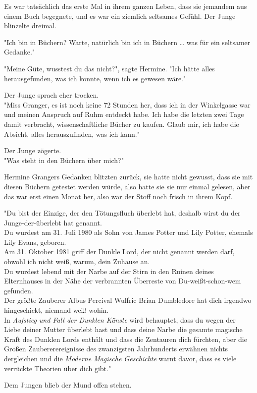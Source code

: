 {Es war tatsächlich das erste Mal in ihrem ganzen Leben, dass sie jemandem aus einem Buch begegnete, und es war ein ziemlich seltsames Gefühl. Der Junge blinzelte dreimal.

"Ich bin in Büchern? Warte, natürlich bin ich in Büchern … was für ein seltsamer Gedanke."

"Meine Güte, wusstest du das nicht?", sagte Hermine. "Ich hätte alles herausgefunden, was ich konnte, wenn ich es gewesen wäre."

Der Junge sprach eher trocken.\\ "Miss Granger, es ist noch keine 72 Stunden her, dass ich in der Winkelgasse war und meinen Anspruch auf Ruhm entdeckt habe. Ich habe die letzten zwei Tage damit verbracht, wissenschaftliche Bücher zu kaufen. Glaub mir, ich habe die Absicht, alles herauszufinden, was ich kann."

Der Junge zögerte.\\ "Was steht in den Büchern über mich?"

Hermine Grangers Gedanken blitzten zurück, sie hatte nicht gewusst, dass sie mit diesen Büchern getestet werden würde, also hatte sie sie nur einmal gelesen, aber das war erst einen Monat her, also war der Stoff noch frisch in ihrem Kopf.

"Du bist der Einzige, der den Tötungsfluch überlebt hat, deshalb wirst du der Junge-der-überlebt hat genannt.\\ Du wurdest am 31. Juli 1980 als Sohn von James Potter und Lily Potter, ehemals Lily Evans, geboren.\\ Am 31. Oktober 1981 griff der Dunkle Lord, der nicht genannt werden darf, obwohl ich nicht weiß, warum, dein Zuhause an.\\ Du wurdest lebend mit der Narbe auf der Stirn in den Ruinen deines Elternhauses in der Nähe der verbrannten Überreste von Du-weißt-schon-wem gefunden.\\ Der größte Zauberer Albus Percival Wulfric Brian Dumbledore hat dich irgendwo hingeschickt, niemand weiß wohin.\\ In \emph{Aufstieg und Fall der Dunklen Künste} wird behauptet, dass du wegen der Liebe deiner Mutter überlebt hast und dass deine Narbe die gesamte magische Kraft des Dunklen Lords enthält und dass die Zentauren dich fürchten, aber die Großen Zaubererereignisse des zwanzigsten Jahrhunderts erwähnen nichts dergleichen und die \emph{Moderne Magische Geschichte} warnt davor, dass es viele verrückte Theorien über dich gibt."

Dem Jungen blieb der Mund offen stehen.

}
